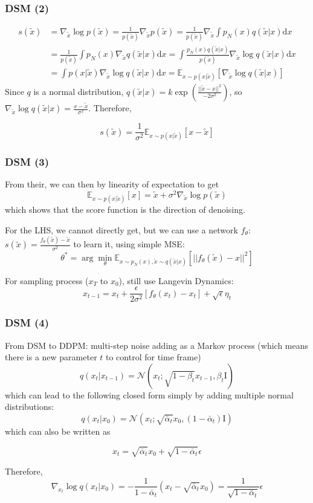 \documentclass{beamer}
\begin{document}
\begin{frame}[t]
\frametitle{DSM (2)}
\begin{align*}
s(\tilde{x})&=\nabla_{\tilde{x}}\log p(\tilde{x})=\frac{1}{p(\tilde{x})}\nabla{_\tilde{x}}p(\tilde{x})
=\frac{1}{p(\tilde{x})}\nabla_{\tilde{x}} \int p_N(x)q(\tilde{x}|x)\text{d}x\\
&=\frac{1}{p(\tilde{x})}\int p_N(x)\nabla_{\tilde{x}}q(\tilde{x}|x)\text{d}x
=\int \frac{p_N(x)q(\tilde{x}|x)}{p(\tilde{x})}\nabla_{\tilde{x}}\log q(\tilde{x}|x)\text{d}x\\
&=\int p(x|\tilde{x})\nabla_{\tilde{x}}\log q(\tilde{x}|x)\text{d}x=\mathbb{E}_{x\sim p(x|\tilde{x})}[\nabla_{\tilde{x}}\log q(\tilde{x}|x)]
\end{align*}
Since $q$ is a normal distribution, $\displaystyle q(\tilde{x}|x)=k\exp\left(\frac{||\tilde{x}-x||^2}{-2\sigma^2}\right)$, so $\displaystyle\nabla{_\tilde{x}}\log q(\tilde{x}|x)=\frac{x-\tilde{x}}{\sigma^2}$. Therefore,
\begin{tcolorbox}[colback=blue!1!white,
                  colframe=blue!75!black]
$$
s(\tilde{x})=\frac{1}{\sigma^2}\mathbb{E}_{x\sim p(x|\tilde{x})}[x-\tilde{x}]
$$
\end{tcolorbox}
\end{frame}

\begin{frame}[t]
\frametitle{DSM (3)}
From their, we can then by linearity of expectation to get
$$
\mathbb{E}_{x\sim p(x|\tilde{x})}[x]=\tilde{x}+\sigma^2\nabla_{\tilde{x}}\log p(\tilde{x})
$$
which shows that the score function is the direction of denoising.
\vspace{1em}

For the LHS, we cannot directly get, but we can use a network $f_\theta$:
$\displaystyle s(\tilde{x})=\frac{f_\theta(\tilde{x})-\tilde{x}}{\sigma^2}$ to learn it, using simple MSE:
$$
\theta^*=\arg\min_\theta \mathbb{E}_{x\sim p_N(x),\tilde{x}\sim q({\tilde{x}}|x)}[||f_\theta({\tilde{x}})-x||^2]
$$

For sampling process ($x_T$ to $x_0$), still use Langevin Dynamics:
$$
x_{t-1}=x_{t}+\frac{\epsilon}{2\sigma^2}[f_\theta(x_t)-x_t]+\sqrt{\epsilon}\eta_t
$$
\end{frame}

\begin{frame}[t]
\frametitle{DSM (4)}
From DSM to DDPM: multi-step noise adding as a Markov process (which means there is a new parameter $t$ to control for time frame)
$$
q(x_t|x_{t-1})=\mathcal{N}(x_t;\sqrt{1-\beta_t}x_{t-1},\beta_t\mathrm{I})
$$
which can lead to the following closed form simply by adding multiple normal distributions:
$$
q(x_t|x_0)=\mathcal{N}(x_t;\sqrt{\bar{\alpha}_t}x_0,(1-\bar\alpha_t)\mathrm{I})
$$
which can also be written as 
\begin{tcolorbox}[colback=blue!1!white,
                  colframe=blue!75!black]
$$
x_t=\sqrt{\bar\alpha_t}x_0+\sqrt{1-\bar\alpha_t}\epsilon
$$
\end{tcolorbox}
Therefore,
$$
\nabla_{x_t}\log q(x_t|x_0)=-\frac{1}{1-\bar\alpha_t}(x_t-\sqrt{\bar\alpha_t}x_0)=
\frac{1}{\sqrt{1-\bar\alpha_t}}\epsilon
$$
\end{frame}
\end{document}
